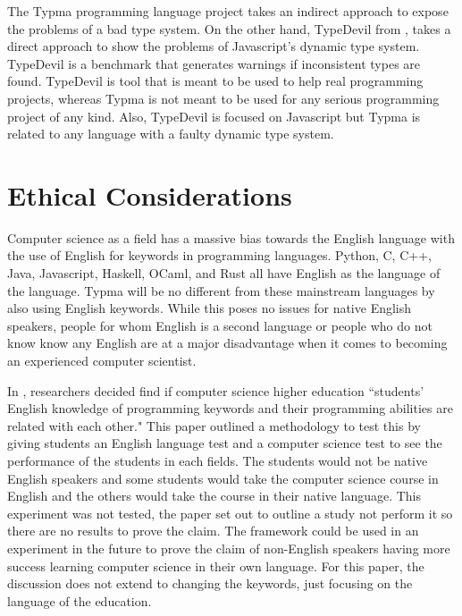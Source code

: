 \documentclass[10pt,twocolumn]{article}
\begin{document}
The Typma programming language project takes an indirect approach to expose the problems of a bad type system. On the other hand, TypeDevil from \textcite{Pradel2014TypeDevil}, takes a direct approach to show the problems of Javascript's dynamic type system. TypeDevil is a benchmark that generates warnings if inconsistent types are found. TypeDevil is tool that is meant to be used to help real programming projects, whereas Typma is not meant to be used for any serious programming project of any kind. Also, TypeDevil is focused on Javascript but Typma is related to any language with a faulty dynamic type system. 

\section{Ethical Considerations}

Computer science as a field has a massive bias towards the English language with the use of English for keywords in programming languages. Python, C, C++, Java, Javascript, Haskell, OCaml, and Rust all have English as the language of the language. Typma will be no different from these mainstream languages by also using English keywords. While this poses no issues for native English speakers, people for whom English is a second language or people who do not know know any English are at a major disadvantage when it comes to becoming an experienced computer scientist. 

 In \textcite{Veerasamy2014Teaching}, researchers decided find if computer science higher education ``students’ English knowledge of programming keywords and their programming abilities are related with each other." This paper outlined a methodology to test this by giving students an English language test and a computer science test to see the performance of the students in each fields. The students would not be native English speakers and some students would take the computer science course in English and the others would take the course in their native language. This experiment was not tested, the paper set out to outline a study not perform it so there are no results to prove the claim. The framework could be used in an experiment in the future to prove the claim of non-English speakers having more success learning computer science in their own language. For this paper, the discussion does not extend to changing the keywords, just focusing on the language of the education.
\end{document}
